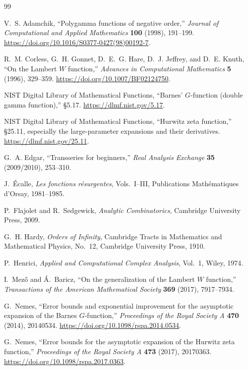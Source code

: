 \documentclass[11pt,oneside]{article}
\theoremstyle{plain}
\theoremstyle{definition}
\theoremstyle{remark}
\begin{document}
\begin{thebibliography}{99}

V.~S. Adamchik,
``Polygamma functions of negative order,''
\emph{Journal of Computational and Applied Mathematics} \textbf{100} (1998),
191--199.
\url{https://doi.org/10.1016/S0377-0427(98)00192-7}.

R.~M. Corless, G.~H. Gonnet, D.~E.~G. Hare, D.~J. Jeffrey, and D.~E. Knuth,
``On the Lambert \(W\) function,''
\emph{Advances in Computational Mathematics} \textbf{5} (1996), 329--359.
\url{https://doi.org/10.1007/BF02124750}.

NIST Digital Library of Mathematical Functions,
``Barnes' \(G\)-function (double gamma function),'' \S5.17.
\url{https://dlmf.nist.gov/5.17}.

NIST Digital Library of Mathematical Functions,
``Hurwitz zeta function,'' \S25.11, especially the large-parameter expansions
and their derivatives.
\url{https://dlmf.nist.gov/25.11}.

G.~A. Edgar,
``Transseries for beginners,''
\emph{Real Analysis Exchange} \textbf{35} (2009/2010), 253--310.

J.~\'Ecalle,
\emph{Les fonctions r\'esurgentes}, Vols.~I--III,
Publications Math\'ematiques d'Orsay, 1981--1985.

P.~Flajolet and R.~Sedgewick,
\emph{Analytic Combinatorics},
Cambridge University Press, 2009.

G.~H. Hardy,
\emph{Orders of Infinity},
Cambridge Tracts in Mathematics and Mathematical Physics, No.~12,
Cambridge University Press, 1910.

P.~Henrici,
\emph{Applied and Computational Complex Analysis}, Vol.~1,
Wiley, 1974.

I.~Mez\H{o} and \'A.~Baricz,
``On the generalization of the Lambert \(W\) function,''
\emph{Transactions of the American Mathematical Society}
\textbf{369} (2017), 7917--7934.

G.~Nemes,
``Error bounds and exponential improvement for the asymptotic expansion of the
Barnes \(G\)-function,''
\emph{Proceedings of the Royal Society A} \textbf{470} (2014), 20140534.
\url{https://doi.org/10.1098/rspa.2014.0534}.

G.~Nemes,
``Error bounds for the asymptotic expansion of the Hurwitz zeta function,''
\emph{Proceedings of the Royal Society A} \textbf{473} (2017), 20170363.
\url{https://doi.org/10.1098/rspa.2017.0363}.


\end{thebibliography}
\end{document}
